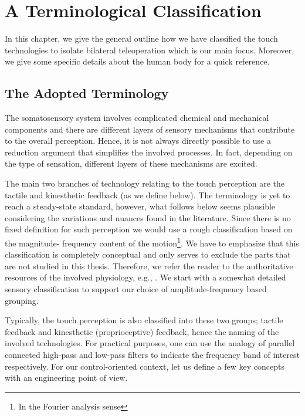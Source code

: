 \chapter{A Terminological Classification}
\label{chap:apdxphysio}

In this chapter, we give the general outline how we have classified the touch technologies to isolate bilateral teleoperation which is 
our main focus. Moreover, we give some specific details about the human body for a quick reference.


\section{The Adopted Terminology}

The somatosensory system involves complicated chemical and mechanical components and there are different layers of sensory mechanisms 
that contribute to the overall perception. Hence, it is not always directly possible to use a reduction argument that simplifies the 
involved processes. In fact, depending on the type of sensation, different layers of these mechanisms are excited.

The main two branches of technology relating to the touch perception are the tactile and kinesthetic feedback (as we define below). The 
terminology is yet to reach a steady-state standard, however, what follows below seems plausible considering the variations and nuances found 
in the literature. Since there is no fixed definition for such perception we would use a rough  classification based on the magnitude-%
frequency content of the motion\footnote{In the Fourier analysis sense}. We have to emphasize that this classification is completely 
conceptual and only serves to exclude the parts that are not studied in this thesis. Therefore, we refer the reader to the authoritative 
resources of the involved physiology, e.g., \cite{kandel}. We start with a somewhat detailed sensory classification to support our choice 
of amplitude-frequency based grouping.

Typically, the touch perception is also classified into these two groups; tactile feedback and kinesthetic (proprioceptive) feedback, 
hence the naming of the involved technologies. For practical purposes, one can use the analogy of parallel connected high-pass and low-pass 
filters to indicate the frequency band of interest respectively. For our control-oriented context, let us define a few key concepts with 
an engineering point of view. 

